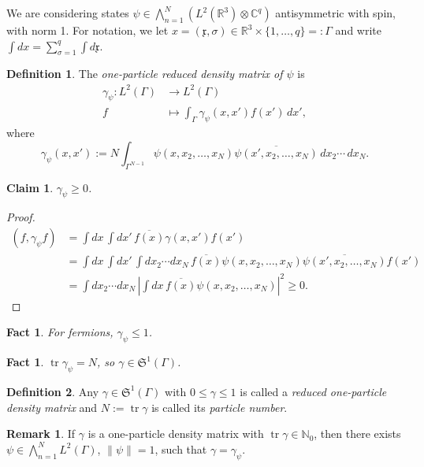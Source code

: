 \documentclass[11pt]{amsart}
\newcommand{\vocab}[1]{\emph{#1}}
\newcommand{\N}{\mathbb{N}}
\newcommand{\R}{\mathbb{R}}
\newcommand{\C}{\mathbb{C}}
\newtheorem{claim}[thm]{Claim}
\newtheorem{fact}[thm]{Fact}
\theoremstyle{definition}
\theoremstyle{definition}
\newtheorem{defn}{Definition}
\theoremstyle{definition}
\newtheorem*{rmk}{Remark}
\numberwithin{equation}{section}
\begin{document}
We are considering states $\psi\in\bigwedge_{n=1}^N(L^2(\R^3)\otimes\C^q)$ antisymmetric with spin, with norm 1.
 For notation, we let $x=(\mathfrak{x},\sigma)\in\R^3\times\{1,\ldots,q\}=:\Gamma$ and write $\int dx=\sum_{\sigma=1}^q\int d\mathfrak{x}$. %
\begin{defn}
The \vocab{one-particle reduced density matrix of $\psi$} is 
\begin{align*}
\gamma_\psi:L^2(\Gamma)&\longrightarrow L^2(\Gamma)\\
f&\longmapsto \int_\Gamma \gamma_\psi(x,x')f(x')\,dx',
\end{align*}
where
\begin{equation}
\gamma_\psi(x,x'):=N\int_{\Gamma^{N-1}}\psi(x,x_2,\ldots,x_N)\overline{\psi(x',x_2,\ldots,x_N)}\,dx_2\cdots\,dx_N.
\end{equation}
\end{defn}
\begin{claim}
$\gamma_\psi\ge0$.
\end{claim}
\begin{proof}
\begin{align*}
(f,\gamma_\psi f)&=\int dx\,\int dx'\,\overline{f(x)}\gamma(x,x')f(x')\\
&=\int dx\,\int dx'\,\int dx_2\cdots dx_N\,\overline{f(x)}\psi(x,x_2,\ldots,x_N)\overline{\psi(x',x_2,\ldots,x_N)}f(x')\\
&=\int dx_2\cdots dx_N\,\left|\int dx\,\overline{f(x)}\psi(x,x_2,\ldots,x_N)\right|^2\ge0.
\end{align*}
\end{proof}

\begin{fact}
For fermions, $\gamma_\psi\le1$.
\end{fact}

\begin{fact}
$\operatorname{tr}\gamma_\psi=N$, so $\gamma\in\mathfrak{S}^1(\Gamma)$.
\end{fact}


\begin{defn}
Any $\gamma\in\mathfrak{S}^1(\Gamma)$ with $0\le\gamma\le1$ is called a \emph{reduced one-particle density matrix} and $N:=\operatorname{tr}\gamma$ is called its \vocab{particle number}.
\end{defn}

\begin{rmk}
If $\gamma$ is a one-particle density matrix with $\operatorname{tr}\gamma\in\N_0$, then there exists $\psi\in\bigwedge_{n=1}^NL^2(\Gamma)$, $\|\psi\|=1$, such that $\gamma=\gamma_\psi$.
\end{rmk}
\end{document}
